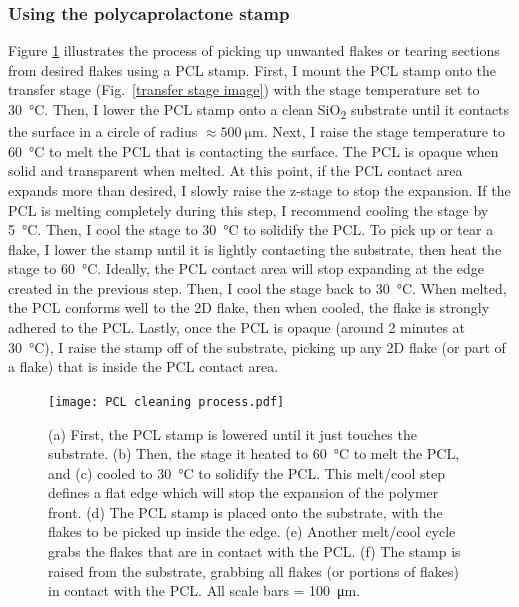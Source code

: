 \documentclass[double,12pt,1in,seploa]{beavtex}
\let\Oldsubsubsection\subsubsection
\renewcommand{\subsubsection}{\FloatBarrier\Oldsubsubsection}
\begin{document}
\subsubsection{Using the polycaprolactone stamp}
Figure \ref{PCL cleaning process} illustrates the process of picking up unwanted flakes or tearing sections from desired flakes using a PCL stamp. First, I mount the PCL stamp onto the transfer stage (Fig.\ \ref{transfer stage image}) with the stage temperature set to \SI{30}{\celsius}. Then, I lower the PCL stamp onto a clean SiO\textsubscript{2} substrate until it contacts the surface in a circle of radius $\approx \SI{500}{\micro\meter}$. Next, I raise the stage temperature to \SI{60}{\celsius} to melt the PCL that is contacting the surface. The PCL is opaque when solid and transparent when melted. At this point, if the PCL contact area expands more than desired, I slowly raise the z-stage to stop the expansion. If the PCL is melting completely during this step, I recommend cooling the stage by \SI{5}{\celsius}. Then, I cool the stage to \SI{30}{\celsius} to solidify the PCL. To pick up or tear a flake, I lower the stamp until it is lightly contacting the substrate, then heat the stage to \SI{60}{\celsius}. Ideally, the PCL contact area will stop expanding at the edge created in the previous step. Then, I cool the stage back to \SI{30}{\celsius}. When melted, the PCL conforms well to the 2D flake, then when cooled, the flake is strongly adhered to the PCL. Lastly, once the PCL is opaque (around 2 minutes at \SI{30}{\celsius}), I raise the stamp off of the substrate, picking up any 2D flake (or part of a flake) that is inside the PCL contact area.

\begin{figure}
    \texttt{[image: PCL cleaning process.pdf]}
    \caption{(a) First, the PCL stamp is lowered until it just touches the substrate. (b) Then, the stage it heated to \SI{60}{\celsius} to melt the PCL, and (c) cooled to \SI{30}{\celsius} to solidify the PCL. This melt/cool step defines a flat edge which will stop the expansion of the polymer front. (d) The PCL stamp is placed onto the substrate, with the flakes to be picked up inside the edge. (e) Another melt/cool cycle grabs the flakes that are in contact with the PCL. (f) The stamp is raised from the substrate, grabbing all flakes (or portions of flakes) in contact with the PCL. All scale bars = \SI{100}{\micro\meter}.}
    \label{PCL cleaning process}
\end{figure}
\end{document}
